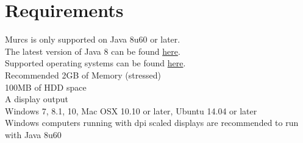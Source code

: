 \section{Requirements}
Murcs is only supported on Java 8u60 or later.\\
The latest version of Java 8 can be found  \href{http://www.oracle.com/technetwork/java/javase/downloads}{here}.\\
Supported operating systems can be found
\href{http://www.oracle.com/technetwork/java/javase/certconfig-2095354.html}{here}.\\

Recommended
2GB of Memory (stressed)\\
100MB of HDD space\\
A display output\\

Windows 7, 8.1, 10, Mac OSX 10.10 or later, Ubuntu 14.04 or later\\
Windows computers running with dpi scaled displays are recommended to run with Java 8u60

